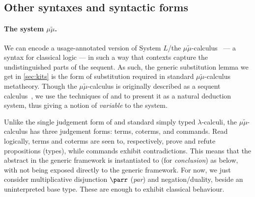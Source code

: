 





\subsection{Other syntaxes and syntactic forms}\label{sec:other-syntaxes}

\paragraph{The system $\mu\tilde\mu$.}
We can encode a usage-annotated version of System $L$/the
$\mu\tilde\mu$-calculus~\cite{CH00} --- a syntax for classical logic --- in
such a way that contexts capture the undistinguished parts of the sequent.
As such, the generic substitution lemma we get in \cref{sec:kits} is the form
of substitution required in standard $\mu\tilde\mu$-calculus metatheory.
Though the $\mu\tilde\mu$-calculus is originally described as a sequent
calculus~\cite{CH00}, we use the techniques of
\citet[p.~12]{herbelin-hab} and \citet{LC06} to present it as a natural
deduction system, thus giving a notion of \emph{variable} to the system.

Unlike the single judgement form of \name{} and standard simply typed
$\lambda$-calculi, the $\mu\tilde\mu$-calculus has three judgement forms:
terms, coterms, and commands.
Read logically, terms and coterms are seen to, respectively, prove and refute
propositions (types), while commands exhibit contradictions.
This means that the abstract  in the generic framework is
instantiated to  (for \emph{conclusion}) as below, with
 not being exposed directly to the generic framework.
For now, we just consider multiplicative disjunction $\parr$ (\emph{par}) and
negation/duality, beside an uninterpreted base type.
These are enough to exhibit classical behaviour.

